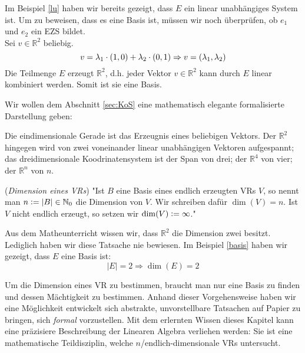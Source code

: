 \begin{example} \label{basis}
Im Beispiel \ref{lu} haben wir bereits gezeigt, dass $E$ ein linear unabhängiges System ist. Um zu beweisen, dass es eine Basis ist, müssen wir noch überprüfen, ob $e_1$ und $e_2$ ein \acl{EZS} bildet.
\\ Sei $v\in \mathbb{R}^2$ beliebig. 
\[v=\lambda_1\cdot(1,0)+\lambda_2\cdot (0,1)\\
\Rightarrow v=(\lambda_1,\lambda_2)\]
Die Teilmenge $E$ erzeugt $\mathbb{R}^2$, d.h. jeder Vektor $v \in \mathbb{R}^2$ kann durch $E$ linear kombiniert werden. Somit ist sie eine Basis.
\end{example}

Wir wollen dem Abschnitt \ref{sec:KoS} eine mathematisch elegante formalisierte Darstellung geben:
\begin{example}
Die eindimensionale Gerade ist das Erzeugnis eines beliebigen Vektors. Der $\mathbb{R}^2$ hingegen wird von zwei voneinander linear unabhängigen Vektoren aufgespannt; das dreidimensionale Koodrinatensystem ist der Span von drei; der $\mathbb{R}^4$ von vier; der $\mathbb{R}^n$ von $n$. 
\end{example}

\theoremstyle{definition}
\begin{definition}\cite[S. 504]{Enzy} (\emph{Dimension eines \acl{VR}s}) \label{def:dim}"Ist $B$ eine Basis eines endlich erzeugten \acl{VR}s $V$, so nennt man $n \vcentcolon= |B| \in \mathbb{N}_0$ die Dimension von $V$. Wir schreiben dafür $\dim(V)= n$. Ist $V$ nicht endlich erzeugt, so setzen wir $\dim(V)\vcentcolon= \infty$." 
\end{definition}

\begin{example}
Aus dem Matheunterricht wissen wir, dass $\mathbb{R}^2$ die Dimension zwei besitzt. Lediglich haben wir diese Tatsache nie bewiesen. Im Beispiel \ref{basis} haben wir gezeigt, dass $E$ eine Basis ist:
\[|E|=2\Rightarrow\dim(E)=2\]
\end{example}

Um die Dimension eines \acl{VR} zu bestimmen, braucht man nur eine Basis zu finden und dessen Mächtigkeit zu bestimmen. Anhand dieser Vorgehensweise haben wir eine Möglichkeit entwickelt sich abstrakte, unvorstellbare Tatsachen auf Papier zu bringen, sich \emph{formal} vorzustellen. Mit dem erlernten Wissen dieses Kapitel kann eine präzisiere Beschreibung der Linearen Algebra verliehen werden: Sie ist eine mathematische Teildisziplin, welche $n$/endlich-dimensionale \aclp{VR} untersucht. 
